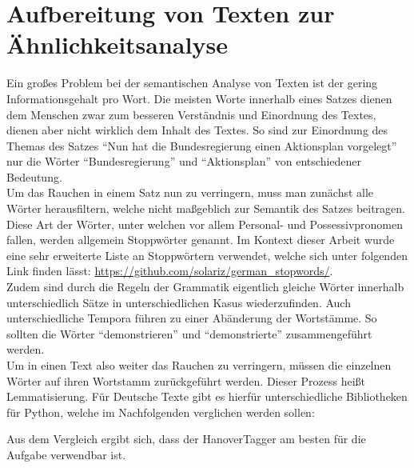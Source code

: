 \section{Aufbereitung von Texten zur Ähnlichkeitsanalyse}
Ein großes Problem bei der semantischen Analyse von Texten ist der gering Informationsgehalt pro Wort. Die meisten Worte innerhalb eines Satzes dienen dem Menschen zwar zum besseren Verständnis und Einordnung des Textes, dienen aber nicht wirklich dem Inhalt des Textes. So sind zur Einordnung des Themas des Satzes "`Nun hat die Bundesregierung einen Aktionsplan vorgelegt"' nur die Wörter "`Bundesregierung"' und "`Aktionsplan"' von entschiedener Bedeutung. \\ \newline
Um das Rauchen in einem Satz nun zu verringern, muss man zunächst alle Wörter herausfiltern, welche nicht maßgeblich zur Semantik des Satzes beitragen. Diese Art der Wörter, unter welchen vor allem Personal- und Possessivpronomen fallen, werden allgemein Stoppwörter genannt. Im Kontext dieser Arbeit wurde eine sehr erweiterte Liste an Stoppwörtern verwendet, welche sich unter folgenden Link finden lässt: \url{https://github.com/solariz/german_stopwords/}. \\ \newline
Zudem sind durch die Regeln der Grammatik eigentlich gleiche Wörter innerhalb unterschiedlich Sätze in unterschiedlichen Kasus wiederzufinden. Auch unterschiedliche Tempora führen zu einer Abänderung der Wortstämme. So sollten die Wörter "`demonstrieren"' und "`demonstrierte"' zusammengeführt werden. \\ \newline
Um in einen Text also weiter das Rauchen zu verringern, müssen die einzelnen Wörter auf ihren Wortstamm zurückgeführt werden. Dieser Prozess heißt Lemmatisierung. Für Deutsche Texte gibt es hierfür unterschiedliche Bibliotheken für Python, welche im Nachfolgenden verglichen werden sollen: \\ \newline


Aus dem Vergleich ergibt sich, dass der HanoverTagger am besten für die Aufgabe verwendbar ist. \\ \newline


